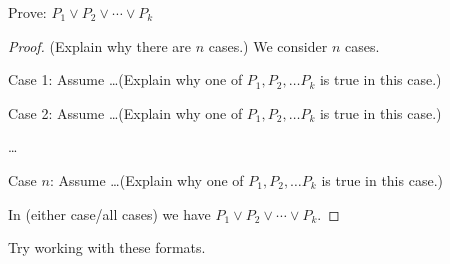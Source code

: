 \begin{pff} 
\label{pff_or_by_cases_generalized} 
Prove: $P_1 \lor P_2 \lor \cdots \lor P_k$
    \begin{proof}
        (Explain why there are $n$ cases.) We consider $n$ cases.
  
        Case 1:  Assume \ldots (Explain why one of $P_1, P_2, \ldots P_k$ is true in this case.) 
        
        Case 2:  Assume \ldots (Explain why one of $P_1, P_2, \ldots P_k$ is true in this case.) 
        
        \ldots

        Case $n$: Assume \ldots (Explain why one of $P_1, P_2, \ldots P_k$ is true in this case.) 
        
        In (either case/all cases) we have $P_1 \lor P_2 \lor \cdots \lor P_k$. 
\end{proof}
\end{pff}

Try working with these formats.


